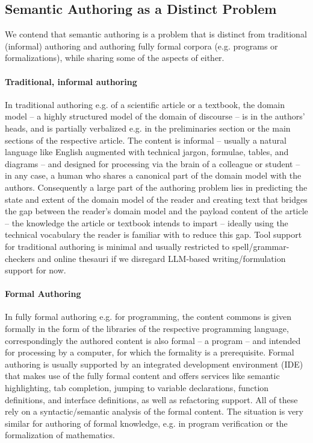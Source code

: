 \documentclass[runningheads]{llncs}
\begin{document}
\subsection{Semantic Authoring as a Distinct Problem}
We contend that semantic authoring is a problem that is distinct from traditional
(informal) authoring and authoring fully formal corpora (e.g. programs or formalizations),
while sharing some of the aspects of either.

\paragraph{Traditional, informal authoring}
In traditional authoring e.g. of a scientific article or a textbook, the domain model -- a
highly structured model of the domain of discourse -- is in the authors' heads, and is
partially verbalized e.g. in the preliminaries section or the main sections of the
respective article. The content is informal -- usually a natural language like English
augmented with technical jargon, formulae, tables, and diagrams -- and designed for
processing via the brain of a colleague or student -- in any case, a human who shares a
canonical part of the domain model with the authors. Consequently a large part of the authoring problem lies in
predicting the state and extent of the domain model of the reader and creating text that
bridges the gap between the reader's domain model and the payload content of the article
-- the knowledge the article or textbook intends to impart -- ideally using the technical
vocabulary the reader is familiar with to reduce this gap. Tool support for traditional
authoring is minimal and usually restricted to spell/grammar-checkers and online thesauri
if we disregard LLM-based writing/formulation support for now.

\paragraph{Formal Authoring}
In fully formal authoring e.g. for programming, the content commons is given formally in
the form of the libraries of the respective programming language, correspondingly the
authored content is also formal -- a program -- and intended for processing by a computer,
for which the formality is a prerequisite. Formal authoring is usually supported by an
integrated development environment (IDE) that makes use of the fully formal content and
offers services like semantic highlighting, tab completion, jumping to variable
declarations, function definitions, and interface definitions, as well as refactoring
support. All of these rely on a syntactic/semantic analysis of the formal content. The
situation is very similar for authoring of formal knowledge, e.g. in program verification
or the formalization of mathematics.
\end{document}
